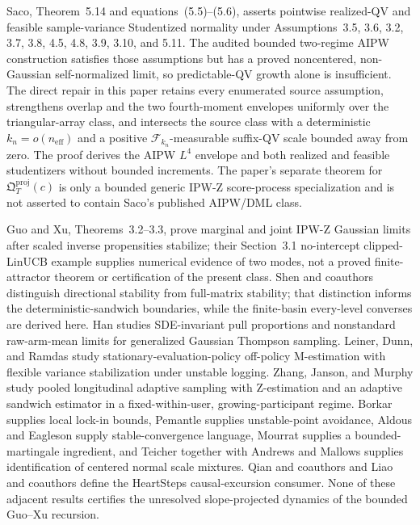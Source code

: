 Saco, Theorem~5.14 and equations~(5.5)--(5.6), asserts pointwise realized-QV and feasible sample-variance Studentized normality under Assumptions~3.5, 3.6, 3.2, 3.7, 3.8, 4.5, 4.8, 3.9, 3.10, and 5.11.  The audited bounded two-regime AIPW construction satisfies those assumptions but has a proved noncentered, non-Gaussian self-normalized limit, so predictable-QV growth alone is insufficient.  The direct repair in this paper retains every enumerated source assumption, strengthens overlap and the two fourth-moment envelopes uniformly over the triangular-array class, and intersects the source class with a deterministic \(k_n=o(n_{\mathrm{eff}})\) and a positive \(\mathcal F_{k_n}\)-measurable suffix-QV scale bounded away from zero.  The proof derives the AIPW \(L^4\) envelope and both realized and feasible studentizers without bounded increments.  The paper's separate theorem for \(\mathfrak Q_T^{\mathrm{proj}}(c)\) is only a bounded generic IPW-Z score-process specialization and is not asserted to contain Saco's published AIPW/DML class.

Guo and Xu, Theorems~3.2--3.3, prove marginal and joint IPW-Z Gaussian limits after scaled inverse propensities stabilize; their Section~3.1 no-intercept clipped-LinUCB example supplies numerical evidence of two modes, not a proved finite-attractor theorem or certification of the present class.  Shen and coauthors distinguish directional stability from full-matrix stability; that distinction informs the deterministic-sandwich boundaries, while the finite-basin every-level converses are derived here.  Han studies SDE-invariant pull proportions and nonstandard raw-arm-mean limits for generalized Gaussian Thompson sampling.  Leiner, Dunn, and Ramdas study stationary-evaluation-policy off-policy M-estimation with flexible variance stabilization under unstable logging.  Zhang, Janson, and Murphy study pooled longitudinal adaptive sampling with Z-estimation and an adaptive sandwich estimator in a fixed-within-user, growing-participant regime.  Borkar supplies local lock-in bounds, Pemantle supplies unstable-point avoidance, Aldous and Eagleson supply stable-convergence language, Mourrat supplies a bounded-martingale ingredient, and Teicher together with Andrews and Mallows supplies identification of centered normal scale mixtures.  Qian and coauthors and Liao and coauthors define the HeartSteps causal-excursion consumer.  None of these adjacent results certifies the unresolved slope-projected dynamics of the bounded Guo--Xu recursion.